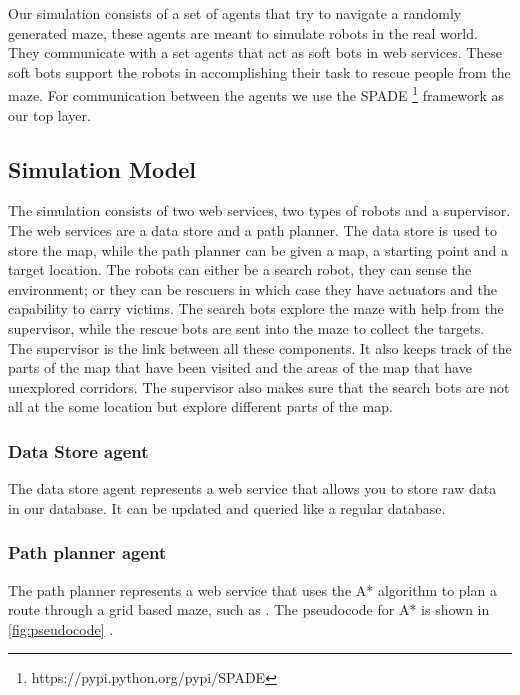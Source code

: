 Our simulation consists of a set of agents that try to navigate a randomly
generated maze, these agents are meant to simulate robots in the real world. 
They communicate with a set agents that act as soft bots in web services. These
soft bots support the robots in accomplishing their task to rescue people from
the maze. For communication between the agents we use the SPADE \footnote{https://pypi.python.org/pypi/SPADE} framework as our top layer.

\subsection{Simulation Model}
The simulation consists of two web services, two types of robots and a
supervisor. The web services are a data store and a path planner. The data
store is used to store the map, while the path planner can be given a map, a
starting point and a target location. The robots can either be a search robot,
they can sense the environment; or they can be rescuers in which case they have
actuators and the capability to carry victims. The search bots explore the maze
with help from the supervisor, while the rescue bots are sent into the maze to
collect the targets. The supervisor is the link between all these components.
It also keeps track of the parts of the map that have been visited and the
areas of the map that have unexplored corridors. The supervisor also makes sure
that the search bots are not all at the some location but explore different
parts of the map.

\subsubsection{Data Store agent}
The data store agent represents a web service that allows you to store raw data in our database. It can be updated and queried like a regular database.  

\subsubsection{Path planner agent}
The path planner represents a web service that uses the A* algorithm
\cite{astar} to plan a route through a grid based maze, such as
\cite{astarweb}. The pseudocode for A* is shown in \autoref{fig:pseudocode} .

